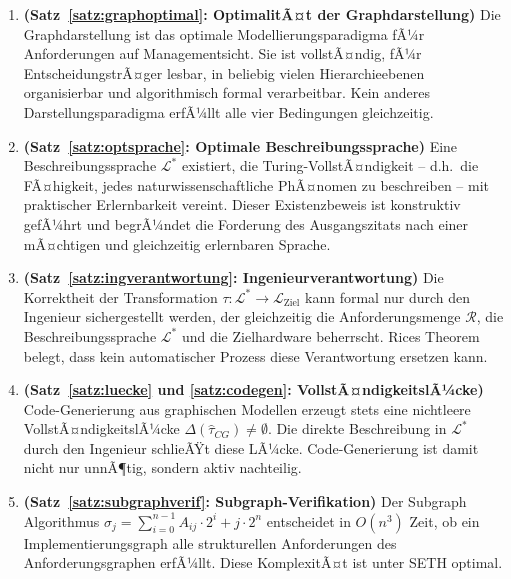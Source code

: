 ﻿\documentclass[a4paper,12pt]{report}
\theoremstyle{definition}
\begin{document}
\begin{enumerate}
  \item \textbf{(Satz~\ref{satz:graphoptimal}: OptimalitÃ¤t der Graphdarstellung)}
        Die Graphdarstellung ist das optimale Modellierungsparadigma fÃ¼r Anforderungen
        auf Managementsicht. Sie ist vollstÃ¤ndig, fÃ¼r EntscheidungstrÃ¤ger lesbar,
        in beliebig vielen Hierarchieebenen organisierbar und algorithmisch formal
        verarbeitbar. Kein anderes Darstellungsparadigma erfÃ¼llt alle vier Bedingungen
        gleichzeitig.

  \item \textbf{(Satz~\ref{satz:optsprache}: Optimale Beschreibungssprache)}
        Eine Beschreibungssprache $\mathcal{L}^*$ existiert, die Turing-VollstÃ¤ndigkeit
        -- d.h.\ die FÃ¤higkeit, jedes naturwissenschaftliche PhÃ¤nomen zu beschreiben --
        mit praktischer Erlernbarkeit vereint. Dieser Existenzbeweis ist konstruktiv
        gefÃ¼hrt und begrÃ¼ndet die Forderung des Ausgangszitats nach einer mÃ¤chtigen
        und gleichzeitig erlernbaren Sprache.

  \item \textbf{(Satz~\ref{satz:ingverantwortung}: Ingenieurverantwortung)}
        Die Korrektheit der Transformation $\tau: \mathcal{L}^* \to \mathcal{L}_{\text{Ziel}}$
        kann formal nur durch den Ingenieur sichergestellt werden, der gleichzeitig
        die Anforderungsmenge $\mathcal{R}$, die Beschreibungssprache $\mathcal{L}^*$
        und die Zielhardware beherrscht. Rices Theorem belegt, dass kein automatischer
        Prozess diese Verantwortung ersetzen kann.

  \item \textbf{(Satz~\ref{satz:luecke} und \ref{satz:codegen}: VollstÃ¤ndigkeitslÃ¼cke)}
        Code-Generierung aus graphischen Modellen erzeugt stets eine nichtleere
        VollstÃ¤ndigkeitslÃ¼cke $\Delta(\hat{\tau}_{CG}) \neq \emptyset$.
        Die direkte Beschreibung in $\mathcal{L}^*$ durch den Ingenieur schlieÃŸt
        diese LÃ¼cke. Code-Generierung ist damit nicht nur unnÃ¶tig, sondern aktiv nachteilig.

  \item \textbf{(Satz~\ref{satz:subgraphverif}: Subgraph-Verifikation)}
        Der Subgraph Algorithmus
        $\sigma_j = \sum_{i=0}^{n-1} A_{ij} \cdot 2^i + j \cdot 2^n$
        entscheidet in $O(n^3)$ Zeit, ob ein Implementierungsgraph alle strukturellen
        Anforderungen des Anforderungsgraphen erfÃ¼llt. Diese KomplexitÃ¤t ist unter SETH
        optimal.


\end{enumerate}
\end{document}
